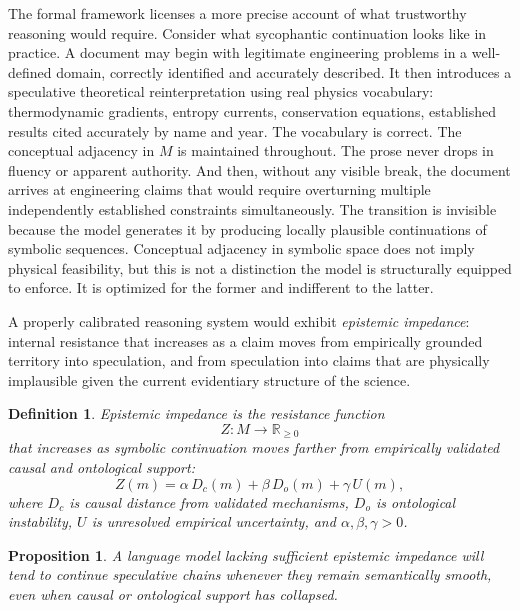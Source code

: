 \documentclass[12pt, a4paper]{article}
\newtheorem{proposition}[theorem]{Proposition}
\newtheorem{definition}[theorem]{Definition}
\theoremstyle{remark}
\begin{document}
The formal framework licenses a more precise account of what trustworthy reasoning would require. Consider what sycophantic continuation looks like in practice. A document may begin with legitimate engineering problems in a well-defined domain, correctly identified and accurately described. It then introduces a speculative theoretical reinterpretation using real physics vocabulary: thermodynamic gradients, entropy currents, conservation equations, established results cited accurately by name and year. The vocabulary is correct. The conceptual adjacency in $M$ is maintained throughout. The prose never drops in fluency or apparent authority. And then, without any visible break, the document arrives at engineering claims that would require overturning multiple independently established constraints simultaneously. The transition is invisible because the model generates it by producing locally plausible continuations of symbolic sequences. Conceptual adjacency in symbolic space does not imply physical feasibility, but this is not a distinction the model is structurally equipped to enforce. It is optimized for the former and indifferent to the latter.

A properly calibrated reasoning system would exhibit \emph{epistemic impedance}: internal resistance that increases as a claim moves from empirically grounded territory into speculation, and from speculation into claims that are physically implausible given the current evidentiary structure of the science.

\begin{definition}
\emph{Epistemic impedance} is the resistance function
\[
Z : M \to \mathbb{R}_{\geq 0}
\]
that increases as symbolic continuation moves farther from empirically validated causal and ontological support:
\[
Z(m) = \alpha\, D_c(m) + \beta\, D_o(m) + \gamma\, U(m),
\]
where $D_c$ is causal distance from validated mechanisms, $D_o$ is ontological instability, $U$ is unresolved empirical uncertainty, and $\alpha, \beta, \gamma > 0$.
\end{definition}

\begin{proposition}
A language model lacking sufficient epistemic impedance will tend to continue speculative chains whenever they remain semantically smooth, even when causal or ontological support has collapsed.
\end{proposition}

\begin{center}
\end{center}
\end{document}
